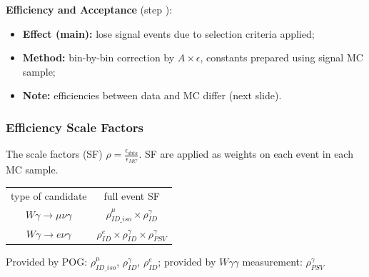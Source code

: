 \begin{frame}
{\bfseries{Efficiency and Acceptance}} (step {\bfseries\color{blue}{``correct for eff X acc''}}): 
  \begin{itemize} 
    \tiny
    \item {\bfseries{Effect (main):}} lose signal events due to selection criteria applied;
    \item {\bfseries{Method:}} bin-by-bin correction by $A\times\epsilon$, constants prepared using signal MC sample;
    \item {\bfseries{Note:}} efficiencies between data and MC differ (next slide).
  \end{itemize}

\end{frame}%

\begin{frame}\frametitle{Efficiency Scale Factors}

\tiny
The scale factors (SF) $\rho = \frac{\epsilon_{data}}{\epsilon_{MC}}$. SF are applied as weights on each event in each MC sample.

\begin{table}[h]
  \tiny
  \begin{center}
   \begin{tabular}{|c|c|}
\hline
 type of candidate                  &   full event SF\\ 
 $W\gamma\rightarrow\mu\nu\gamma$   &   $\rho^{\mu}_{ID\_iso} \times \rho^{\gamma}_{ID}$    \\
 $W\gamma\rightarrow e\nu\gamma$    &   $\rho^{e}_{ID} \times \rho^{\gamma}_{ID}\times \rho^{\gamma}_{PSV}$       \\ \hline
  \end{tabular}
  \label{tab:SFs_Applied}
  \end{center}
\end{table}
Provided by POG: $\rho^{\mu}_{ID\_iso}$, $\rho^{\gamma}_{ID}$,  $\rho^{e}_{ID}$;       provided by $W\gamma\gamma$ measurement: $\rho^{\gamma}_{PSV}$


\end{frame}
